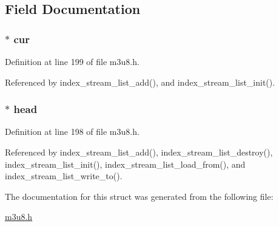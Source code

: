 \subsection{\-Field \-Documentation}
\hypertarget{struct_index_stream_list_a57743db12937a74df7a81d3286c74d55}{
\subsubsection[{cur}]{$\ast$ {\bf cur}}}\label{struct_index_stream_list_a57743db12937a74df7a81d3286c74d55}


\-Definition at line 199 of file m3u8.\-h.



\-Referenced by index\-\_\-stream\-\_\-list\-\_\-add(), and index\-\_\-stream\-\_\-list\-\_\-init().

\hypertarget{struct_index_stream_list_aeca35d85f7eaa7b959214594bd625c0d}{
\subsubsection[{head}]{$\ast$ {\bf head}}}\label{struct_index_stream_list_aeca35d85f7eaa7b959214594bd625c0d}


\-Definition at line 198 of file m3u8.\-h.



\-Referenced by index\-\_\-stream\-\_\-list\-\_\-add(), index\-\_\-stream\-\_\-list\-\_\-destroy(), index\-\_\-stream\-\_\-list\-\_\-init(), index\-\_\-stream\-\_\-list\-\_\-load\-\_\-from(), and index\-\_\-stream\-\_\-list\-\_\-write\-\_\-to().



\-The documentation for this struct was generated from the following file\-:\begin{DoxyCompactItemize}
\item 
\hyperlink{m3u8_8h}{m3u8.\-h}\end{DoxyCompactItemize}

